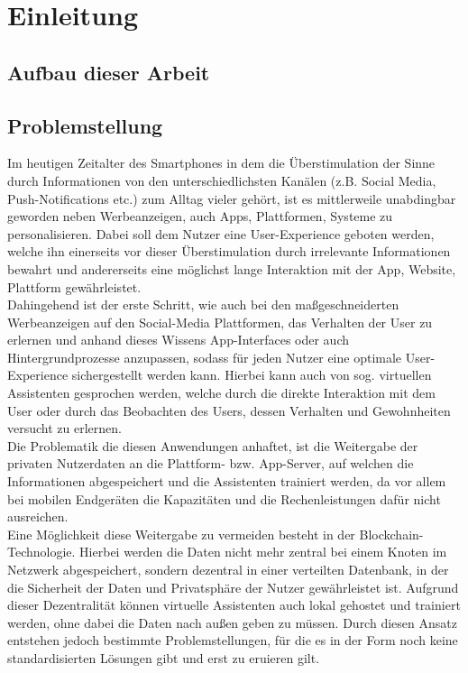 \chapter{Einleitung}
\label{kap:Kapitel01}
%
       
%
\section{Aufbau dieser Arbeit}
%
 
%
\section{Problemstellung}
Im heutigen Zeitalter des Smartphones in dem die Überstimulation der Sinne durch Informationen von den unterschiedlichsten Kanälen (z.B. Social Media, Push-Notifications etc.) zum Alltag vieler gehört, ist es mittlerweile unabdingbar geworden neben Werbeanzeigen, auch Apps, Plattformen, Systeme zu personalisieren. Dabei soll dem Nutzer eine User-Experience geboten werden, welche ihn einerseits vor dieser Überstimulation durch irrelevante Informationen bewahrt und andererseits eine möglichst lange Interaktion mit der App, Website, Plattform gewährleistet. \\
Dahingehend ist der erste Schritt, wie auch bei den maßgeschneiderten Werbeanzeigen auf den Social-Media Plattformen, das Verhalten der User zu erlernen und anhand dieses Wissens App-Interfaces oder auch Hintergrundprozesse anzupassen, sodass für jeden Nutzer eine optimale User-Experience sichergestellt werden kann. Hierbei kann auch von sog. virtuellen Assistenten gesprochen werden, welche durch die direkte Interaktion mit dem User oder durch das Beobachten des Users, dessen Verhalten und Gewohnheiten versucht zu erlernen. \\
Die Problematik die diesen Anwendungen anhaftet, ist die Weitergabe der privaten Nutzerdaten an die Plattform- bzw. App-Server, auf welchen die Informationen abgespeichert und die Assistenten trainiert werden, da vor allem bei mobilen Endgeräten die Kapazitäten und die Rechenleistungen dafür nicht ausreichen. \\
Eine Möglichkeit diese Weitergabe zu vermeiden besteht in der Blockchain-Technologie. Hierbei werden die Daten nicht mehr zentral bei einem Knoten im Netzwerk abgespeichert, sondern dezentral in einer verteilten Datenbank, in der die Sicherheit der Daten und Privatsphäre der Nutzer gewährleistet ist. Aufgrund dieser Dezentralität können virtuelle Assistenten auch lokal gehostet und trainiert werden, ohne dabei die Daten nach außen geben zu müssen. Durch diesen Ansatz entstehen jedoch bestimmte Problemstellungen, für die es in der Form noch keine standardisierten Lösungen gibt und erst zu eruieren gilt. \\
